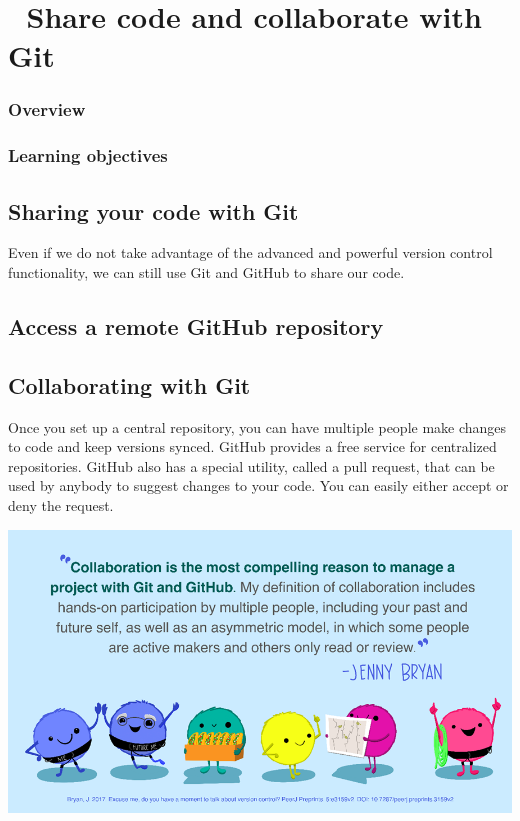 \documentclass[
  letterpaper,
  DIV=11,
  numbers=noendperiod,
  oneside]{scrreprt}
\begin{document}
\hypertarget{share-code-and-collaborate-with-git}{%
\chapter{\texorpdfstring{{📘} Share code and collaborate with
Git}{📘 Share code and collaborate with Git}}\label{share-code-and-collaborate-with-git}}

\hypertarget{overview-5}{%
\subsection{Overview}\label{overview-5}}

\hypertarget{learning-objectives-5}{%
\subsection{Learning objectives}\label{learning-objectives-5}}

\hypertarget{sharing-your-code-with-git}{%
\section{Sharing your code with Git}\label{sharing-your-code-with-git}}

Even if we do not take advantage of the advanced and powerful version
control functionality, we can still use Git and GitHub to share our
code.

\hypertarget{access-a-remote-github-repository}{%
\section{Access a remote GitHub
repository}\label{access-a-remote-github-repository}}

\hypertarget{collaborating-with-git}{%
\section{Collaborating with Git}\label{collaborating-with-git}}

Once you set up a central repository, you can have multiple people make
changes to code and keep versions synced. GitHub provides a free service
for centralized repositories. GitHub also has a special utility, called
a pull request, that can be used by anybody to suggest changes to your
code. You can easily either accept or deny the request.

\includegraphics{./images/paste-ADC9719C.png}
\end{document}

